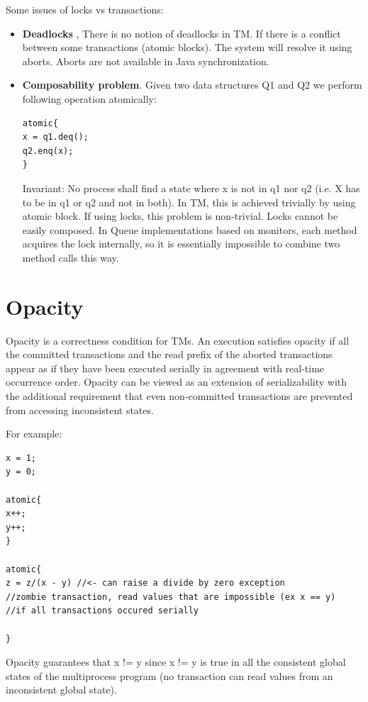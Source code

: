 \documentclass[twoside]{article}
\begin{document}
Some issues of locks vs transactions:
\begin{itemize}
\item \textbf{Deadlocks} , There is no notion of deadlocks in TM. If there is a conflict between some transactions (atomic blocks). The system will resolve it using aborts. Aborts are not available in Java synchronization.
\item \textbf{Composability problem}. Given two data structures Q1 and Q2 we perform following operation atomically:
\begin{lstlisting}
atomic{
x = q1.deq();
q2.enq(x);
}
\end{lstlisting}

Invariant: No process shall find a state where x is not in q1 nor q2 (i.e. X has to be in q1 or q2 and not in both). In TM, this is achieved trivially by using atomic block. If using locks, this problem is non-trivial. Locks cannot be easily composed. In Queue implementations based on monitors, each method acquires the lock internally, so it is essentially impossible to combine two method calls this way.

\end{itemize}

\section{Opacity}
Opacity is a correctness condition for TMs. An execution satisfies opacity if all the committed transactions and the read prefix of the aborted transactions appear as if they have been executed serially in agreement with real-time occurrence order. Opacity can be viewed as an extension of serializability with the additional requirement that even non-committed transactions are prevented from accessing inconsistent states.

For example:
\begin{lstlisting}
x = 1;
y = 0;

atomic{
x++;
y++;
}

atomic{
z = z/(x - y) //<- can raise a divide by zero exception
//zombie transaction, read values that are impossible (ex x == y)
//if all transactions occured serially

}

\end{lstlisting}

Opacity guarantees that x != y since x != y is true in all the consistent global states of the multiprocess program (no transaction can read values from an inconsistent global state). 
\end{document}
